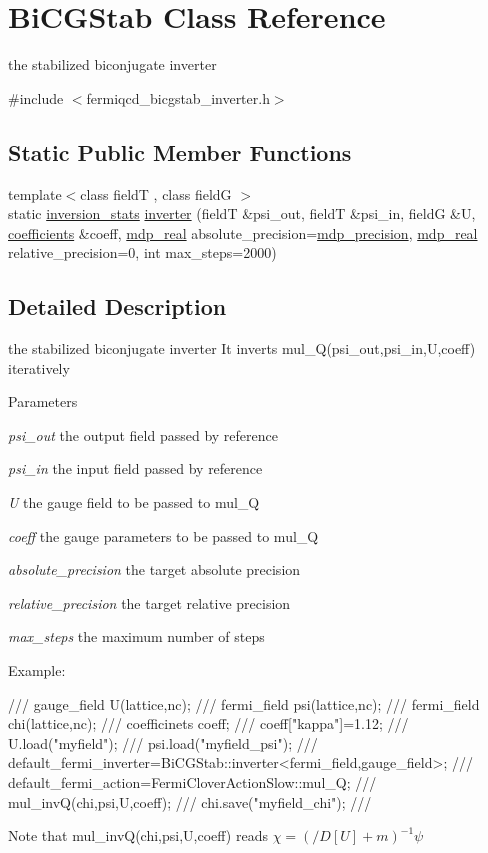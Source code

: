 \hypertarget{class_bi_c_g_stab}{
\section{BiCGStab Class Reference}
\label{class_bi_c_g_stab}
}


the stabilized biconjugate inverter  


{\ttfamily \#include $<$fermiqcd\_\-bicgstab\_\-inverter.h$>$}\subsection*{Static Public Member Functions}
\begin{DoxyCompactItemize}
\item 
{\footnotesize template$<$class fieldT , class fieldG $>$ }\\static \hyperlink{classinversion__stats}{inversion\_\-stats} \hyperlink{class_bi_c_g_stab_a97cec9f05989420749ef3191c81ffa1c}{inverter} (fieldT \&psi\_\-out, fieldT \&psi\_\-in, fieldG \&U, \hyperlink{classcoefficients}{coefficients} \&coeff, \hyperlink{mdp__global__vars_8h_a049e4c1d4e74d644878a42f9909463e4}{mdp\_\-real} absolute\_\-precision=\hyperlink{mdp__global__vars_8h_a443a4ca745298420893e113a7ac926a9}{mdp\_\-precision}, \hyperlink{mdp__global__vars_8h_a049e4c1d4e74d644878a42f9909463e4}{mdp\_\-real} relative\_\-precision=0, int max\_\-steps=2000)
\end{DoxyCompactItemize}


\subsection{Detailed Description}
the stabilized biconjugate inverter It inverts mul\_\-Q(psi\_\-out,psi\_\-in,U,coeff) iteratively 
\begin{DoxyParams}{Parameters}
\item[{\em psi\_\-out}]the output field passed by reference \item[{\em psi\_\-in}]the input field passed by reference \item[{\em U}]the gauge field to be passed to mul\_\-Q \item[{\em coeff}]the gauge parameters to be passed to mul\_\-Q \item[{\em absolute\_\-precision}]the target absolute precision \item[{\em relative\_\-precision}]the target relative precision \item[{\em max\_\-steps}]the maximum number of steps\end{DoxyParams}
Example: \begin{DoxyVerb}
/// gauge_field U(lattice,nc);
/// fermi_field psi(lattice,nc);
/// fermi_field chi(lattice,nc);
/// coefficinets coeff;
/// coeff["kappa"]=1.12;
/// U.load("myfield");
/// psi.load("myfield_psi");
/// default_fermi_inverter=BiCGStab::inverter<fermi_field,gauge_field>;
/// default_fermi_action=FermiCloverActionSlow::mul_Q;
/// mul_invQ(chi,psi,U,coeff);
/// chi.save("myfield_chi");
/// \end{DoxyVerb}
 Note that mul\_\-invQ(chi,psi,U,coeff) reads $ \chi=(/\!\!\!D[U]+m)^{-1}\psi $ 


